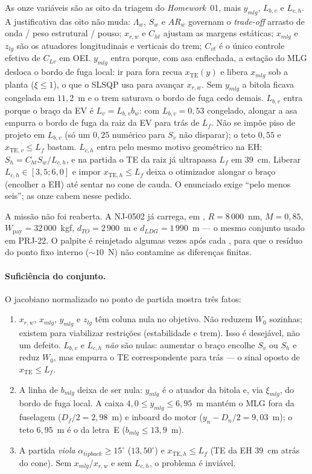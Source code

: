 As onze variáveis são as oito da triagem do \emph{Homework}~01, mais
$y_{mlg}$, $L_{b,v}$ e $L_{c,h}$. A justificativa das oito não muda: $\Lambda_w$,
$S_w$ e $AR_w$ governam o \emph{trade-off} arrasto de onda / peso estrutural
/ pouso; $x_{r,w}$ e $C_{ht}$ ajustam as margens estáticas; $x_{mlg}$ e
$z_{lg}$ são os atuadores longitudinais e verticais do trem; $C_{vt}$ é
o único controle efetivo de $C_{Lv}$ em OEI. $y_{mlg}$ entra porque, com
asa enflechada, a estação do MLG desloca o bordo de fuga local: ir
para fora recua $x_{\mathrm{TE}}(y)$ e libera $x_{mlg}$ sob a planta
($\xi\le 1$), o que o SLSQP usa para avançar $x_{r,w}$. Sem $y_{mlg}$
a bitola ficava congelada em $11{,}2$~m e o trem saturava o bordo de fuga
cedo demais. $L_{b,v}$ entra porque o braço da EV é $L_v=L_{b,v}b_w$:
com $L_{b,v}=0{,}53$ congelado, alongar a asa empurra o bordo de fuga
da raiz da EV para trás de $L_f$. Não se impõe piso de projeto em
$L_{b,v}$ (só um $0{,}25$ numérico para $S_v$ não disparar); o teto
$0{,}55$ e $x_{\mathrm{TE},v}\le L_f$ bastam. $L_{c,h}$ entra pelo mesmo
motivo geométrico na EH: $S_h=C_{ht}S_w/L_{c,h}$, e na partida o TE da
raiz já ultrapassa $L_f$ em $39$~cm. Liberar $L_{c,h}\in[3{,}5;6{,}0]$ e
impor $x_{\mathrm{TE},h}\le L_f$ deixa o otimizador alongar o braço
(encolher a EH) até sentar no cone de cauda. O enunciado exige ``pelo
menos seis''; as onze cabem nesse pedido.

A missão não foi reaberta. A NJ-0502 já carrega, em
, $R=8\,000$~nm, $M=0{,}85$,
$W_{\mathrm{pay}}=32\,000$~kgf, $d_{TO}=2\,900$~m e
$d_{LDG}=1\,990$~m --- o mesmo conjunto usado em PRJ-22. O palpite
 é reinjetado algumas vezes após cada ,
para que o resíduo do ponto fixo interno ($\sim 10$~N) não contamine as
diferenças finitas.

\paragraph{Suficiência do conjunto.}
O jacobiano normalizado no ponto de partida mostra três fatos:
\begin{enumerate}
\item $x_{r,w}$, $x_{mlg}$, $y_{mlg}$ e $z_{lg}$ têm coluna nula no
      objetivo. Não reduzem $W_0$ sozinhas; existem para viabilizar
      restrições (estabilidade e trem). Isso é desejável, não
      um defeito. $L_{b,v}$ e $L_{c,h}$ \emph{não} são nulas: aumentar o
      braço encolhe $S_v$ ou $S_h$ e reduz $W_0$, mas empurra o TE
      correspondente para trás --- o sinal oposto de
      $x_{\mathrm{TE}}\le L_f$.
\item A linha de $b_{mlg}$ deixa de ser nula: $y_{mlg}$ é o atuador da
      bitola e, via $\xi_{mlg}$, do bordo de fuga local. A caixa
      $4{,}0\le y_{mlg}\le 6{,}95$~m mantém o MLG fora da fuselagem
      ($D_f/2=2{,}98$~m) e inboard do motor ($y_n-D_n/2=9{,}03$~m); o teto
      $6{,}95$~m é o da letra~E ($b_{mlg}\le 13{,}9$~m).
\item A partida \emph{viola} $\alpha_{tipback}\ge 15^\circ$
      ($13{,}50^\circ$) e $x_{\mathrm{TE},h}\le L_f$ (TE da EH $39$~cm
      atrás do cone). Sem $x_{mlg}$/$x_{r,w}$ e sem $L_{c,h}$, o
      problema é inviável.
\end{enumerate}

